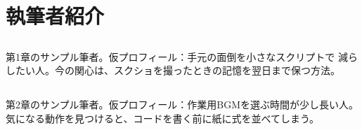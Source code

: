 \chapter{執筆者紹介}
\section*{\AuthorOne}
第1章のサンプル筆者。仮プロフィール：手元の面倒を小さなスクリプトで
減らしたい人。今の関心は、スクショを撮ったときの記憶を翌日まで保つ方法。
\section*{\AuthorTwo}
第2章のサンプル筆者。仮プロフィール：作業用BGMを選ぶ時間が少し長い人。
気になる動作を見つけると、コードを書く前に紙に式を並べてしまう。
